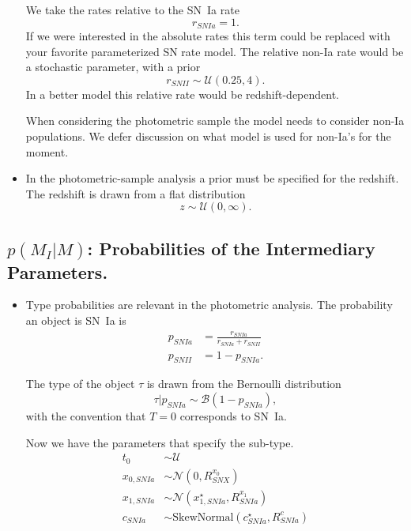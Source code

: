 \documentclass[preprint,3p]{elsarticle}
\begin{document}
\begin{itemize}
We take the rates relative to the SN~Ia rate
\begin{equation}
r_{SNIa} = 1.
\end{equation}
If we were interested in the absolute rates this term could be replaced with your favorite parameterized
SN rate model.
The relative non-Ia rate would be a stochastic parameter, with a prior
\begin{equation}
r_{SNII} \sim \mathcal{U}(0.25, 4).
\end{equation}
In a better model this relative rate would be redshift-dependent.

When considering the photometric sample the model needs to consider non-Ia populations.
We defer discussion on what model is used for non-Ia's for the moment.

\item 
In the photometric-sample analysis a prior must be specified for the redshift.  The redshift is drawn from a flat distribution
\begin{equation}
z\sim \mathcal{U}(0,\infty).
\end{equation}
\end{itemize}

\subsection{$p(M_I|M)$: Probabilities of the Intermediary Parameters.}
\begin{itemize}
\item Type probabilities are relevant in the photometric analysis.
The probability an object is SN~Ia is
\begin{align}
p_{SNIa} &= \frac{r_{SNIa}}{r_{SNIa}+r_{SNII}} \nonumber \\
p_{SNII}&=1-p_{SNIa}.
\label{prob:eqn}
\end{align}

The type of the object $\tau$ is drawn from the Bernoulli distribution 
\begin{equation}
\tau | p_{SNIa} \sim \mathcal{B}(1-p_{SNIa}),
\end{equation}
with the convention that $T=0$ corresponds to SN~Ia.


Now we have the parameters that specify the sub-type.
\begin{align}
t_0 & \sim \mathcal{U}\\
x_{0, SNIa} & \sim \mathcal{N}(0,R^{x_0}_{SNX})\\
x_{1,SNIa} & \sim \mathcal{N}(x_{1,SNIa}^\star,R^{x_1}_{SNIa})\\
c_{SNIa} & \sim \text{SkewNormal}(c^\star_{SNIa},R^{c}_{SNIa} )
\end{align}

\end{itemize}
\end{document}
